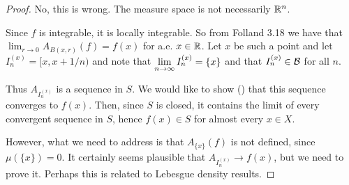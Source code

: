     \begin{proof}
       No, this is wrong. The measure space is not necessarily $\mathbb{R}^n$.

      Since $f$ is integrable, it is locally integrable. So from Folland 3.18 we have
      that $\lim_{r \to 0} A_{B(x, r)}(f) = f(x)$ for a.e. $x \in \mathbb{R}$. Let $x$ be such a point and
      let $I^{(x)}_n = [x, x + 1/n)$ and note that $\limninf I^{(x)}_n = \{x\}$ and that $I^{(x)}_n \in \mathcal B$ for
      all $n$.

      Thus $A_{I^{(x)}_n}$ is a sequence in $S$. We would like to show () that this sequence converges
      to $f(x)$. Then, since $S$ is closed, it contains the limit of every convergent sequence in $S$,
      hence $f(x) \in S$ for almost every $x \in X$.

       However, what we need to address is that $A_{\{x\}}(f)$ is not defined, since $\mu(\{x\}) = 0$. It
      certainly seems plausible that $A_{I^{(x)}_n} \to f(x)$, but we need to prove it. Perhaps this is related to
      Lebesgue density results.
    \end{proof}
